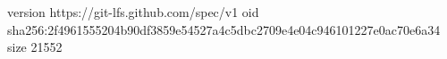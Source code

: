 version https://git-lfs.github.com/spec/v1
oid sha256:2f4961555204b90df3859e54527a4c5dbc2709e4e04c946101227e0ac70e6a34
size 21552
